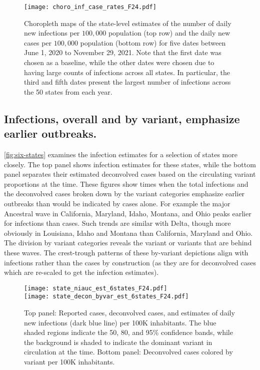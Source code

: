 \begin{figure}[!tb]
\centering
\texttt{[image: choro\_inf\_case\_rates\_F24.pdf]}
\caption{Choropleth maps of the state-level estimates of the number of daily new
infections per $100,000$ population (top row) and the daily new cases per
$100,000$ population (bottom row) for five dates between June 1, 2020 to
November 29, 2021. Note that the first date was chosen as a baseline, while the
other dates were chosen due to having large counts of infections across all
states. In particular, the third and fifth dates present the largest number of
infections across the 50 states from each year.} 
\label{fig:choro_inf_case_rates}
\end{figure}    



    
\subsection{Infections, overall and by variant, emphasize earlier outbreaks.}
\label{sec:infections-by-voc}

\autoref{fig:six-states} examines the infection estimates for a selection of
states more closely. The top panel shows infection estimates for these states,
while the bottom panel separates their estimated deconvolved cases based on the
circulating variant proportions at the time. These figures show times when the
total infections and the deconvolved cases broken down by the variant categories
emphasize earlier outbreaks than would be indicated by cases alone. For example
the major Ancestral wave in California, Maryland, Idaho, Montana, and Ohio
peaks earlier for infections than cases. Such trends are similar with Delta,
though more obviously in Louisiana, Idaho and Montana than California, Maryland
and Ohio. The division by variant categories reveals the variant or variants that
are behind these waves. The crest-trough patterns of these by-variant depictions
align with infections rather than the cases by construction (as they are for
deconvolved cases which are re-scaled to get the infection estimates). 


\begin{figure}[!tb]
\centering
    \texttt{[image: state\_niauc\_est\_6states\_F24.pdf]}\\
    \texttt{[image: state\_decon\_byvar\_est\_6states\_F24.pdf]}
    \caption{Top panel: Reported cases, deconvolved cases, and estimates of
    daily new infections (dark blue line) per 100K inhabitants. The blue shaded
    regions indicate the 50, 80, and 95\% confidence bands, while the background
    is shaded to indicate the dominant variant in circulation at the time.  
    Bottom panel: Deconvolved cases colored by variant per 100K inhabitants.}
    \label{fig:six-states}
\end{figure}



